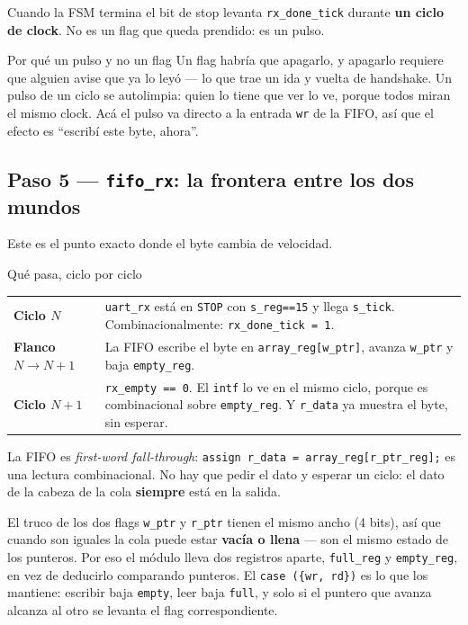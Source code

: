 \documentclass[11pt,a4paper]{article}
\newcommand{\sg}[1]{\texttt{\small #1}}
\begin{document}
Cuando la FSM termina el bit de stop levanta \sg{rx\_done\_tick} durante
\textbf{un ciclo de clock}. No es un flag que queda prendido: es un pulso.

\begin{intuicion}{Por qu\'e un pulso y no un flag}
Un flag habr\'ia que apagarlo, y apagarlo requiere que alguien avise que ya lo
ley\'o --- lo que trae un ida y vuelta de handshake. Un pulso de un ciclo se
autolimpia: quien lo tiene que ver lo ve, porque todos miran el mismo clock.
Ac\'a el pulso va directo a la entrada \sg{wr} de la FIFO, as\'i que el efecto es
``escrib\'i este byte, ahora''.
\end{intuicion}

\subsection{Paso 5 --- \texttt{fifo\_rx}: la frontera entre los dos mundos}

Este es el punto exacto donde el byte cambia de velocidad.

\begin{ficha}{Qu\'e pasa, ciclo por ciclo}
\renewcommand{\arraystretch}{1.2}
\begin{tabular}{@{}>{\bfseries\sffamily}l p{11.2cm}@{}}
\toprule
Ciclo $N$   & \sg{uart\_rx} est\'a en \sg{STOP} con \sg{s\_reg==15} y llega
              \sg{s\_tick}. Combinacionalmente: \sg{rx\_done\_tick = 1}. \\
Flanco $N{\to}N{+}1$ & La FIFO escribe el byte en \sg{array\_reg[w\_ptr]},
              avanza \sg{w\_ptr} y baja \sg{empty\_reg}. \\
Ciclo $N{+}1$ & \sg{rx\_empty == 0}. El \sg{intf} lo ve en el mismo ciclo, porque
              es combinacional sobre \sg{empty\_reg}. Y \sg{r\_data} ya muestra el
              byte, sin esperar. \\
\bottomrule
\end{tabular}

\smallskip
La FIFO es \emph{first-word fall-through}: \sg{assign r\_data = array\_reg[r\_ptr\_reg];}
es una lectura combinacional. No hay que pedir el dato y esperar un ciclo: el dato
de la cabeza de la cola \textbf{siempre} est\'a en la salida.
\end{ficha}

\begin{ojo}{El truco de los dos flags}
\sg{w\_ptr} y \sg{r\_ptr} tienen el mismo ancho (4 bits), as\'i que cuando son
iguales la cola puede estar \textbf{vac\'ia o llena} --- son el mismo estado de los
punteros. Por eso el m\'odulo lleva dos registros aparte, \sg{full\_reg} y
\sg{empty\_reg}, en vez de deducirlo comparando punteros. El \sg{case (\{wr, rd\})}
es lo que los mantiene: escribir baja \sg{empty}, leer baja \sg{full}, y solo si
el puntero que avanza alcanza al otro se levanta el flag correspondiente.
\end{ojo}
\end{document}
